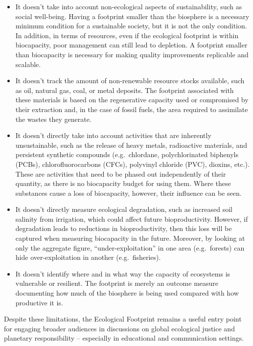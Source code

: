 \documentclass[
  a4paper,
  DIV=11,
  numbers=noendperiod,
  oneside,
  openany]{scrreprt}
\begin{document}
\begin{tcolorbox}
\begin{itemize}
\item
  It doesn't take into account non-ecological aspects of sustainability,
  such as social well-being. Having a footprint smaller than the
  biosphere is a necessary minimum condition for a sustainable society,
  but it is not the only condition. In addition, in terms of resources,
  even if the ecological footprint is within biocapacity, poor
  management can still lead to depletion. A footprint smaller than
  biocapacity is necessary for making quality improvements replicable
  and scalable.
\item
  It doesn't track the amount of non-renewable resource stocks
  available, such as oil, natural gas, coal, or metal deposits. The
  footprint associated with these materials is based on the regenerative
  capacity used or compromised by their extraction and, in the case of
  fossil fuels, the area required to assimilate the wastes they
  generate.
\item
  It doesn't directly take into account activities that are inherently
  unsustainable, such as the release of heavy metals, radioactive
  materials, and persistent synthetic compounds (e.g.~chlordane,
  polychlorinated biphenyls (PCBs), chlorofluorocarbons (CFCs),
  polyvinyl chloride (PVC), dioxins, etc.). These are activities that
  need to be phased out independently of their quantity, as there is no
  biocapacity budget for using them. Where these substances cause a loss
  of biocapacity, however, their influence can be seen.
\item
  It doesn't directly measure ecological degradation, such as increased
  soil salinity from irrigation, which could affect future
  bioproductivity. However, if degradation leads to reductions in
  bioproductivity, then this loss will be captured when measuring
  biocapacity in the future. Moreover, by looking at only the aggregate
  figure, ``under-exploitation'' in one area (e.g.~forests) can hide
  over-exploitation in another (e.g.~fisheries).
\item
  It doesn't identify where and in what way the capacity of ecosystems
  is vulnerable or resilient. The footprint is merely an outcome measure
  documenting how much of the biosphere is being used compared with how
  productive it is.
\end{itemize}

Despite these limitations, the Ecological Footprint remains a useful
entry point for engaging broader audiences in discussions on global
ecological justice and planetary responsibility -- especially in
educational and communication settings.

\end{tcolorbox}
\end{document}
